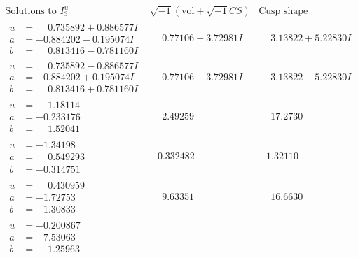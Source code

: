 \documentclass[1p]{elsarticle_modified}
\theoremstyle{definition}
\newcommand{\I}{\sqrt{-1}}
\begin{document}
$$\begin{array}{c|c|c}  
\text{Solutions to }I^u_{3}& \I (\text{vol} + \sqrt{-1}CS) & \text{Cusp shape}\\
 \hline 
\begin{aligned}
u &= \phantom{-}0.735892 + 0.886577 I \\
a &= -0.884202 - 0.195074 I \\
b &= \phantom{-}0.813416 - 0.781160 I\end{aligned}
 & \phantom{-}0.77106 - 3.72981 I & \phantom{-}3.13822 + 5.22830 I \\ \hline\begin{aligned}
u &= \phantom{-}0.735892 - 0.886577 I \\
a &= -0.884202 + 0.195074 I \\
b &= \phantom{-}0.813416 + 0.781160 I\end{aligned}
 & \phantom{-}0.77106 + 3.72981 I & \phantom{-}3.13822 - 5.22830 I \\ \hline\begin{aligned}
u &= \phantom{-}1.18114\phantom{ +0.000000I} \\
a &= -0.233176\phantom{ +0.000000I} \\
b &= \phantom{-}1.52041\phantom{ +0.000000I}\end{aligned}
 & \phantom{-}2.49259\phantom{ +0.000000I} & \phantom{-}17.2730\phantom{ +0.000000I} \\ \hline\begin{aligned}
u &= -1.34198\phantom{ +0.000000I} \\
a &= \phantom{-}0.549293\phantom{ +0.000000I} \\
b &= -0.314751\phantom{ +0.000000I}\end{aligned}
 & -0.332482\phantom{ +0.000000I} & -1.32110\phantom{ +0.000000I} \\ \hline\begin{aligned}
u &= \phantom{-}0.430959\phantom{ +0.000000I} \\
a &= -1.72753\phantom{ +0.000000I} \\
b &= -1.30833\phantom{ +0.000000I}\end{aligned}
 & \phantom{-}9.63351\phantom{ +0.000000I} & \phantom{-}16.6630\phantom{ +0.000000I} \\ \hline\begin{aligned}
u &= -0.200867\phantom{ +0.000000I} \\
a &= -7.53063\phantom{ +0.000000I} \\
b &= \phantom{-}1.25963\phantom{ +0.000000I}\end{aligned}

\end{array}$$
\end{document}
